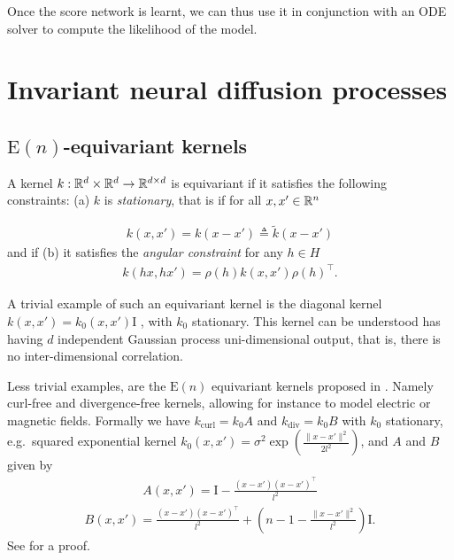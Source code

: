 Once the score network is learnt, we can thus use it in conjunction with an ODE solver to compute the likelihood of the model.

\section{Invariant neural diffusion processes}
\label{sec:inv_ndp}

\subsection{$\mathrm{E}(n)$-equivariant kernels}
\label{sec:en_equiv_kernels}

A kernel $k: \mathbb{R}^d \times \mathbb{R}^d \rightarrow \mathbb{R}^{d\times d}$ is equivariant if it satisfies the following constraints: (a) $k$ is \emph{stationary}, that is if for all $x, x' \in \mathbb{R}^n$ 

\begin{align} k(x, x') = k(x - x') \triangleq \tilde{k}(x - x') \end{align} and if (b) it satisfies the \emph{angular constraint} for any $h \in H$ \begin{align} k(h x, h x') = \rho(h) k(x, x') \rho(h)^\top.
\end{align}

A trivial example of such an equivariant kernel is the diagonal kernel $k(x,x') = k_0(x, x') \mathrm{I}$ \parencite{holderrieth2021equivariant}, with $k_0$ stationary.
This kernel can be understood has having $d$ independent Gaussian process uni-dimensional output, that is, there is no inter-dimensional correlation.

Less trivial examples, are the $\mathrm{E}(n)$ equivariant kernels proposed in \textcite{macedo2010learning}.
Namely curl-free and divergence-free kernels, allowing for instance to model electric or magnetic fields.
Formally we have $k_\mathrm{curl} = k_0 A$ and $k_\mathrm{div} = k_0 B$ with $k_0$ stationary, e.g.\ squared exponential kernel $k_0(x, x') = \sigma^2 \exp\left(\frac{\| x - x' \|^2}{2 l^2} \right)$, and $A$ and $B$ given by \begin{align} A(x, x') = \mathrm{I} - \frac{(x - x')(x - x')^\top}{l^2} \end{align} \begin{align} B(x, x') = \frac{(x - x')(x - x')^\top}{l^2} + \left( n -1 - \frac{\|x - x' \|^2}{l^2} \right) \mathrm{I}.
\end{align}
See \textcite[Appendix C, ][]{holderrieth2021equivariant} for a proof.

